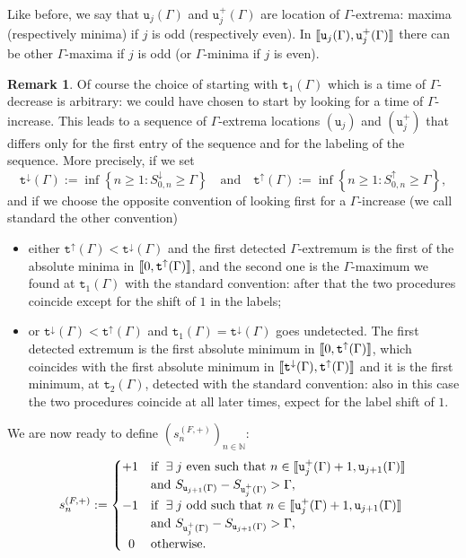 \documentclass[10pt]{amsart}
\theoremstyle{definition}\newtheorem{defi}[theo]{Definition}\newtheorem{rema}[theo]{Remark}\newtheorem{exam}[theo]{Example}\newtheorem{exem}[theo]{Example}\newtheorem{nota}[theo]{Notation}
\newcommand{\bbN}{\mathbb{N}}
\newcommand{\gG}{\Gamma}
\renewcommand*\ss{\mathtt{u}}
\newcommand{\ttt}{\mathtt{t}}
\newcommand{\tu}{\ss}
\newcommand{\tuplus}{\ss^+}
\let\oldexists\exists
\renewcommand*{\exists}{\mathrel{\oldexists}}
\newcommand{\llbracket}{\mathopen{[\mkern -2.7mu[}}
\newcommand{\rrbracket}{\mathclose{]\mkern -2.7mu]}}
\newcommand{\lbra}{\llbracket}
\newcommand{\rbra}{\rrbracket}
\begin{document}
Like before, we say that $\tu_{j}(\gG)$ and $\tu_{j}^+(\gG)$ are location of $\gG$-extrema: maxima (respectively minima) if $j$ is odd (respectively even). In $\lbra \tu_{j}(\gG), \tu_{j}^+(\gG)\rbra$ there can be other $\gG$-maxima if $j$ is odd (or $\gG$-minima if $j$ is even).


\begin{rema}\label{rem:arbitrary-choice}
Of course the choice of starting with $\ttt_1(\gG)$ which is a time of $\gG$-decrease is arbitrary: we could have chosen to start by looking for a time of $\gG$-increase. This leads to a sequence of $\gG$-extrema locations $(\tu_j)$ and $(\tuplus_j)$ that differs only for the first entry of the sequence and for the labeling of the sequence. More precisely, if we set
\begin{equation}\label{eq:t-down-up}
\ttt^\downarrow(\gG) := \inf\left\{n\ge 1: S^\downarrow_{0,n} \ge \gG\right\}
\quad \text{and}\quad \ttt^\uparrow(\gG):= \inf\left\{n\ge 1: S^\uparrow_{0,n} \ge \gG\right\},
\end{equation}
and if we choose the opposite convention of looking first for a $\gG$-increase (we call standard the other convention)
\begin{itemize}
\item either $\ttt^\uparrow(\gG)< \ttt^\downarrow(\gG)$ and the first detected $\gG$-extremum is the first of the absolute minima in $\lbra 0,\ttt^\uparrow(\gG)\rbra$, and the second one is the $\gG$-maximum we found at $\ttt_1(\gG)$ with the standard convention: after that the two procedures coincide except for the shift of $1$ in the labels;
\item or $ \ttt^\downarrow(\gG)< \ttt^\uparrow(\gG)$ and $\ttt_1(\gG)=\ttt^\downarrow(\gG)$ goes undetected. The first detected extremum is the first absolute minimum in $\lbra 0, \ttt^\uparrow(\gG)\rbra$, which coincides with the first absolute minimum in $\lbra \ttt^\downarrow(\gG), \ttt^\uparrow(\gG)\rbra$ and it is the first minimum, at $\ttt_2(\gG)$, detected with the standard convention: also in this case the two procedures coincide at all later times, expect for the label shift of $1$.
\end{itemize}
\end{rema}

We are now ready to define $(s_n^{(F, +)})_{n \in \bbN}$:
\begin{equation}\label{eq:sF+}
s_n^{(F, +)}:=
\begin{cases}
+1 & \text{if } \exists j \text{ even such that } n \in \lbra\tu^+_j(\gG)+1, \tu_{j+1}(\gG)\rbra\\
&\text{and } S_{\tu_{j+1}(\gG)}-S_{\tu^+_j(\gG)} > \gG,
\\
-1 & \text{if } \exists j \text{ odd such that } n \in \lbra\tu^+_j(\gG)+1, \tu_{j+1}(\gG)\rbra\\
&\text{and } S_{\tu^+_j(\gG)}-S_{\tu_{j+1}(\gG)}> \gG,
\\ \phantom{1} 0 & \text{otherwise.}
\end{cases}
\end{equation}
\end{document}
